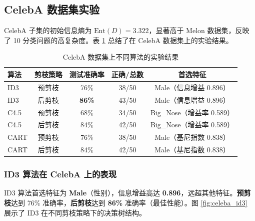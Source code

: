 \documentclass[UTF8]{ctexart}
\begin{document}
\subsection{CelebA 数据集实验}

CelebA 子集的初始信息熵为 $\text{Ent}(D) = 3.322$，显著高于 Melon 数据集，反映了 10 分类问题的高复杂度。表 \ref{tab:celeba_results} 总结了在 CelebA 数据集上的实验结果。

\begin{table}[H]
    \centering
    \caption{CelebA 数据集上不同算法的实验结果}
    \label{tab:celeba_results}
    \begin{tabular}{lcccc}
    \toprule
    \textbf{算法} & \textbf{剪枝策略} & \textbf{测试准确率} & \textbf{正确/总数} & \textbf{首选特征} \\
    \midrule
    ID3 & 预剪枝 & 76\% & 38/50 & Male（信息增益 0.896） \\
    ID3 & 后剪枝 & \textbf{86\%} & 43/50 & Male（信息增益 0.896） \\
    \midrule
    C4.5 & 预剪枝 & 68\% & 34/50 & Big\_Nose（增益率 0.589） \\
    C4.5 & 后剪枝 & 84\% & 42/50 & Big\_Nose（增益率 0.589） \\
    \midrule
    CART & 预剪枝 & 76\% & 38/50 & Male（基尼指数 0.838） \\
    CART & 后剪枝 & 84\% & 42/50 & Male（基尼指数 0.838） \\
    \bottomrule
    \end{tabular}
\end{table}

\subsubsection{ID3 算法在 CelebA 上的表现}

ID3 算法首选特征为 \textbf{Male}（性别），信息增益高达 \textbf{0.896}，远超其他特征。\textbf{预剪枝}达到 76\% 准确率，\textbf{后剪枝}达到 \textbf{86\%} 准确率（最佳性能）。图 \ref{fig:celeba_id3} 展示了 ID3 在不同剪枝策略下的决策树结构。
\end{document}
